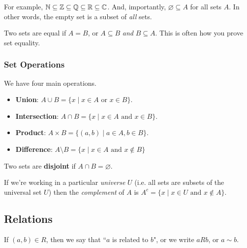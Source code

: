 \documentclass[12pt]{article}
\begin{document}

For example, ${\mathbb N} \subseteq {\mathbb Z} \subseteq {\mathbb Q} \subseteq {\mathbb R} \subseteq {\mathbb C}$. And,
importantly, $\varnothing \subseteq A$ for all sets $A$. In other words, the
empty set is a subset of {\it all} sets.

Two sets are equal if $A = B$, or $A \subseteq B$ {\it and} $B \subseteq A$.
This is often how you prove set equality.

\subsubsection{Set Operations}

We have four main operations.

\begin{itemize}
	\item {\bf Union}: $A \cup B = \{x \mid x \in A \text{ or } x \in B \}$.
	\item {\bf Intersection}: $A \cap B = \{ x \mid x \in A \text{ and } x \in B \}$.
	\item {\bf Product}: $A \times B = \{(a, b) \mid a \in A, b \in B \}$.
	\item {\bf Difference}: $A \setminus B = \{x \mid x \in A \text{ and } x \not\in B\}$
\end{itemize}

Two sets are {\bf disjoint} if $A \cap B = \varnothing$.

If we're working in a particular {\it universe} $U$ (i.e. all sets are subsets
of the universal set $U$) then the {\it complement} of $A$ is $A^c = \{x \mid x
	\in U \text{ and } x \not\in A \}$.

\subsection{Relations}


If $(a, b) \in R$, then we say that ``$a$ is related to $b$", or we write
$aRb$, or $a \sim b$.
\end{document}
